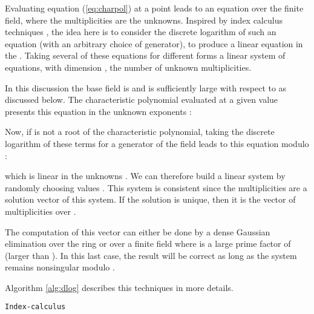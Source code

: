 \documentclass{article}
\begin{document}
Evaluating equation (\ref{eq:charpol}) at a point  leads to an
equation over the finite field, where the  multiplicities  are
the unknowns.
Inspired by index calculus techniques
\cite{Coppersmith:1986:IndexCalculus},
 the idea here is to consider the discrete
logarithm of such an equation (with an arbitrary choice of generator), to
produce a linear equation in the . Taking several of these
equations for different
 forms a linear system of equations, with dimension ,
the number of
unknown multiplicities.

In this discussion the base field is  and  is sufficiently
large with respect to  as discussed below. 
The characteristic polynomial evaluated at a given value   presents this 
equation in the unknown exponents :


Now, if  is not a root of the characteristic polynomial, taking the
discrete logarithm of these terms for a generator  of the field leads 
to this equation modulo :

which is linear in the unknowns .
We can therefore build a  linear system by randomly choosing  values
. This system is consistent since the multiplicities 
are a solution vector of this system. If the solution is unique, then it is the
vector of multiplicities over .

The computation of this vector can either be done by a dense Gaussian
elimination over the ring  or over a finite field  
where  is a large prime factor of  (larger than ).
In this last case, the result will be correct as long as the system
remains nonsingular modulo .






Algorithm \ref{alg:dlog} describes this techniques in more details.

\newcommand{\dlogsys}{\texttt{Index-calculus}}
\begin{algorithm}
  \dontprintsemicolon
  \caption{\dlogsys}\label{alg:dlog}
\end{algorithm}
\end{document}
